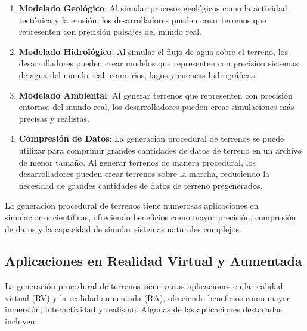 \begin{enumerate}
    \item \textbf{Modelado Geológico}: Al simular procesos geológicos como la actividad tectónica y la erosión, los desarrolladores pueden crear terrenos que representen con precisión paisajes del mundo real\cite{GeologiaDocumento}.
    
    \item \textbf{Modelado Hidrológico}: Al simular el flujo de agua sobre el terreno, los desarrolladores pueden crear modelos que representen con precisión sistemas de agua del mundo real, como ríos, lagos y cuencas hidrográficas\cite{HidrologiaDocumento}.
    
    \item \textbf{Modelado Ambiental}: Al generar terrenos que representen con precisión entornos del mundo real, los desarrolladores pueden crear simulaciones más precisas y realistas\cite{AdaptiveTerrainGeneration}.
    
    \item \textbf{Compresión de Datos}: La generación procedural de terrenos se puede utilizar para comprimir grandes cantidades de datos de terreno en un archivo de menor tamaño. Al generar terrenos de manera procedural, los desarrolladores pueden crear terrenos sobre la marcha, reduciendo la necesidad de grandes cantidades de datos de terreno pregenerados\cite{RealWorldDataTerrain}.
\end{enumerate}
 
La generación procedural de terrenos tiene numerosas aplicaciones en simulaciones científicas, ofreciendo beneficios como mayor precisión, compresión de datos y la capacidad de simular sistemas naturales complejos.

\subsection{Aplicaciones en Realidad Virtual y Aumentada}

La generación procedural de terrenos tiene varias aplicaciones en la realidad virtual (RV) y la realidad aumentada (RA), ofreciendo beneficios como mayor inmersión, interactividad y realismo. Algunas de las aplicaciones destacadas incluyen:

